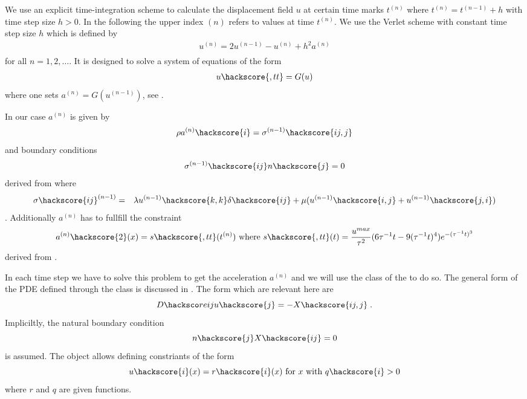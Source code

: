 We use an explicit time-integration scheme to calculate the displacement field $u$ at 
certain time marks $t^{(n)}$ where $t^{(n)}=t^{(n-1)}+h$ with time step size $h>0$. In the following the upper index ${(n)}$ refers to values at time $t^{(n)}$. We use the Verlet scheme  with constant time step size $h$
which is defined by
\begin{eqnarray} \label{WAVE dyn 2}
u^{(n)}=2u^{(n-1)}-u^{(n)} + h^2 a^{(n)} \\
\end{eqnarray}
for all $n=1,2,\ldots$. It is designed to solve a system of equations of the form
\begin{eqnarray} \label{WAVE dyn 2b} 
u\hackscore{,tt}=G(u)
\end{eqnarray}
where one sets $a^{(n)}=G(u^{(n-1)})$, see . 

In our case $a^{(n)}$ is given by
\begin{eqnarray}\label{WAVE dyn 3}
\rho a^{(n)}\hackscore{i}=\sigma^{(n-1)}\hackscore{ij,j}
\end{eqnarray}
and boundary conditions
\begin{eqnarray} \label{WAVE natural}
\sigma^{(n-1)}\hackscore{ij}n\hackscore{j}=0
\end{eqnarray}
derived from  where 
\begin{eqnarray} \label{WAVE dyn 3a}
\sigma\hackscore{ij}^{(n-1)} & = & \lambda u^{(n-1)}\hackscore{k,k} \delta\hackscore{ij} + \mu ( u^{(n-1)}\hackscore{i,j} + u^{(n-1)}\hackscore{j,i})
\end{eqnarray}.
Additionally $a^{(n)}$ has to fullfill the constraint
\begin{eqnarray}\label{WAVE dyn 4}
a^{(n)}\hackscore{2}(x)= s\hackscore{,tt}(t^{(n)})\mbox{ where } s\hackscore{,tt}(t)=\frac{u^{max}}{\tau^2}
(6\tau^{-1}t- 9(\tau^{-1}t)^4) e^{-(\tau^{-1}t)^3}  
\end{eqnarray}
derived from . 

In each time step we have to solve this problem to get the acceleration $a^{(n)}$ and we will
use the \LinearPDE class of the \linearPDEsPack to do so. The general form of the PDE defined through
the \LinearPDE class is discussed in . The form which are relevant here are  
\begin{equation}\label{WAVE dyn 100}
D\hacksco
re{ij} u\hackscore{j} = - X\hackscore{ij,j}\; .
\end{equation}
Impliciltly, the natural boundary condition
\begin{equation}\label{WAVE dyn 101}
n\hackscore{j}X\hackscore{ij} =0 
\end{equation}
is assumed. The \LinearPDE object allows defining constriants of the form
\begin{equation}\label{WAVE dyn 101}
u\hackscore{i}(x)=r\hackscore{i}(x) \mbox{ for } x \mbox{ with } q\hackscore{i}>0
\end{equation}
where $r$ and $q$ are given functions.

